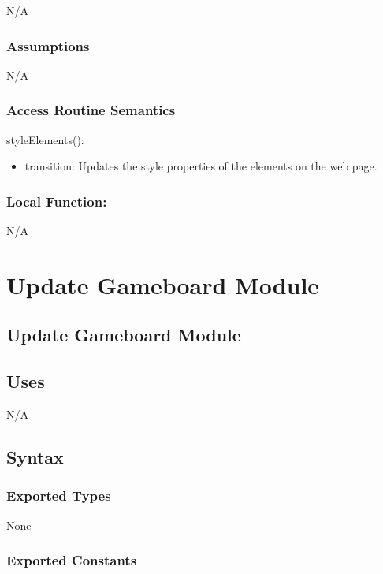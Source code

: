 \documentclass[12pt]{article}
\begin{document}
N/A

\subsubsection* {Assumptions}

N/A

\subsubsection* {Access Routine Semantics}

\noindent styleElements():
\begin{itemize}
  \item transition: Updates the style properties of the elements on the web page.
\end{itemize}

\subsubsection*{Local Function:}

N/A

\newpage

\section {Update Gameboard Module}

\subsection* {Update Gameboard Module}

\subsection* {Uses}

N/A

\subsection* {Syntax}

\subsubsection* {Exported Types}

None

\subsubsection* {Exported Constants}
\end{document}
